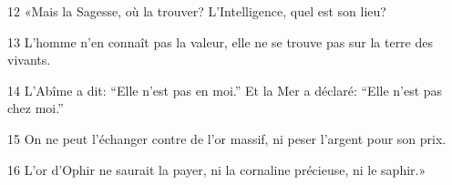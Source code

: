 12 «Mais la Sagesse, où la trouver? L’Intelligence, quel est son lieu?

13 L’homme n’en connaît pas la valeur, elle ne se trouve pas sur la terre des vivants.

14 L’Abîme a dit: “Elle n’est pas en moi.” Et la Mer a déclaré: “Elle n’est pas chez moi.”

15 On ne peut l’échanger contre de l’or massif, ni peser l’argent pour son prix.

16 L’or d’Ophir ne saurait la payer, ni la cornaline précieuse, ni le saphir.»
